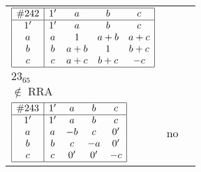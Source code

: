 \documentclass[12pt]{article}
\theoremstyle{definition}
\newcommand\RRA{\operatorname{RRA}}
\newcommand\notRRA{\ensuremath{\notin \RRA}}
\newcommand{\join}{\mathbin{+}}%
\newcommand{\id}{{1'}}%
\renewcommand{\div}{0'}
\renewcommand{\top}{1}%
\begin{document}
\begin{center}
\begin{longtable}{l|c|c}
$
\begin{array}{|c|cccc|} \hline
\#242 & \id & a & b & c \\ \hline
\id & \id & a & b & c \\
a & a & \top & a \join b & a \join c \\
b & b & a \join b & \top & b \join c \\
c & c & a \join c & b \join c & -c \\ \hline
\end{array}
$
 & \begin{tabular}{c} yes \\ $23_{65}$ \\ \notRRA \end{tabular} 
 & \adjustbox{valign=c, max height=1.6cm}{$
\left[ \begin{array}{cccccc}
\id & a & a & b & c & b \\ 
a & \id & a & a & a & a \\ 
a & a & \id & b & c & b \\ 
b & a & b & \id & b & b \\ 
c & a & c & b & \id & c \\ 
b & a & b & b & c & \id
\end{array}\right]
$}      \\[15mm]

$
\begin{array}{|c|cccc|} \hline
\#243 & \id & a & b & c \\ \hline
\id & \id & a & b & c \\
a & a & -b & c & \div \\
b & b & c & -a & \div \\
c & c & \div & \div & -c \\ \hline
\end{array}
$
 & no  
 & \adjustbox{valign=c, max height=1.6cm}{$
\left[ \begin{array}{cccccc}
\id & a & a & c & a & c \\ 
a & \id & a & a & c & c \\ 
a & a & \id & c & c & b \\ 
c & a & c & \id & b & b \\ 
a & c & c & b & \id & b \\ 
c & c & b & b & b & \id
\end{array}\right]
$}      \\[15mm]


\end{longtable}
\end{center}
\end{document}
